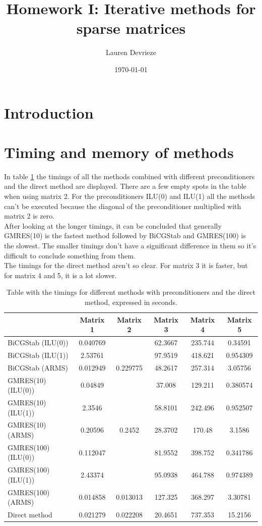 \documentclass{article}
\title{Homework I: Iterative methods for sparse matrices}
\author{Lauren Devrieze}
\date{\today}
\begin{document}
	
	\maketitle
	
	\section*{Introduction}
	
	\section{Timing and memory of methods}
		
	In table \ref{tableTimings} the timings of all the methods combined with different preconditioners and the direct method are displayed. There are a few empty spots in the table when using matrix 2. For the preconditioners ILU(0) and ILU(1) all the methods can't be executed because the diagonal of the preconditioner multiplied with matrix 2 is zero.\\
	After looking at the longer timings, it can be concluded that generally GMRES(10) is the fastest method followed by BiCGStab and GMRES(100) is the slowest. The smaller timings don't have a significant difference in them so it's difficult to conclude something from them. \\
	The timings for the direct method aren't so clear. For matrix 3 it is faster, but for matrix 4 and 5, it is a lot slower. \\
	
	\begin{table}[h]
		\centering
		\begin{tabular}{|l|c|c|c|c|c|}
			\hline
							 & Matrix 1 & Matrix 2 & Matrix 3 & Matrix 4 & Matrix 5 \\\hline \hline 
			BiCGStab (ILU(0)) & 0.040769 & 		& 62.3667 & 235.744 & 0.34591 \\ \hline
			BiCGStab (ILU(1)) & 2.53761 & 	     & 97.9519 & 418.621 & 0.954309 \\ \hline
			BiCGStab (ARMS)  & 0.012949 & 0.229775 & 48.2617 & 257.314 & 3.05756 \\ \hline \hline
			GMRES(10) (ILU(0)) &  0.04849 & 	 & 37.008 & 129.211 & 0.380574  \\ \hline
			GMRES(10) (ILU(1)) & 2.3546 & 	    & 58.8101 & 242.496 & 0.952507 \\ \hline
			GMRES(10) (ARMS) & 0.20596 & 0.2452 & 28.3702 & 170.48 & 3.1586 \\ \hline \hline
			GMRES(100) (ILU(0)) & 0.112047 &    & 81.9552 & 398.752 & 0.341786 \\ \hline
			GMRES(100) (ILU(1)) & 2.43374 &     & 95.0938 & 464.788 & 0.974389 \\ \hline
			GMRES(100) (ARMS) & 0.014858 & 0.013013 & 127.325 & 368.297 & 3.30781 \\ \hline \hline
			Direct method & 0.021279 & 0.022208 & 20.4651 & 737.353  & 15.2156 \\ \hline
		\end{tabular}
		\caption{Table with the timings for different methods with preconditioners and the direct method, expressed in seconds.}
		\label{tableTimings}
	\end{table}
	
\end{document}
